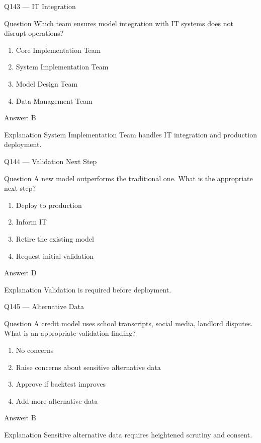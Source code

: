 \documentclass[aspectratio=169,8pt]{beamer}
\begin{document}
	\begin{frame}{Q143 --- IT Integration}
		\begin{block}{Question}
			Which team ensures model integration with IT systems does not disrupt operations?
		\end{block}
		\begin{enumerate}
			\item Core Implementation Team
			\item System Implementation Team
			\item Model Design Team
			\item Data Management Team
		\end{enumerate}
		\begin{exampleblock}{Answer: B}\end{exampleblock}
		\begin{block}{Explanation}
			System Implementation Team handles IT integration and production deployment.
		\end{block}
	\end{frame}
	
	\begin{frame}{Q144 --- Validation Next Step}
		\begin{block}{Question}
			A new model outperforms the traditional one. What is the appropriate next step?
		\end{block}
		\begin{enumerate}
			\item Deploy to production
			\item Inform IT
			\item Retire the existing model
			\item Request initial validation
		\end{enumerate}
		\begin{exampleblock}{Answer: D}\end{exampleblock}
		\begin{block}{Explanation}
			Validation is required before deployment.
		\end{block}
	\end{frame}
	
	\begin{frame}{Q145 --- Alternative Data}
		\begin{block}{Question}
			A credit model uses school transcripts, social media, landlord disputes. What is an appropriate validation finding?
		\end{block}
		\begin{enumerate}
			\item No concerns
			\item Raise concerns about sensitive alternative data
			\item Approve if backtest improves
			\item Add more alternative data
		\end{enumerate}
		\begin{exampleblock}{Answer: B}\end{exampleblock}
		\begin{block}{Explanation}
			Sensitive alternative data requires heightened scrutiny and consent.
		\end{block}
	\end{frame}
	
\end{document}
